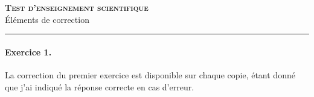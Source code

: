 \documentclass[11pt]{article}
\begin{document}

\begin{center}
\textbf{\LARGE \textsc{Test d'enseignement scientifique}}\\[1mm]

{\Large Éléments de correction}\\
\noindent\rule{12cm}{0.4pt}
\end{center}

\paragraph{Exercice 1.}
La correction du premier exercice est disponible sur chaque copie, étant donné
que j'ai indiqué la réponse correcte en cas d'erreur.
\end{document}
